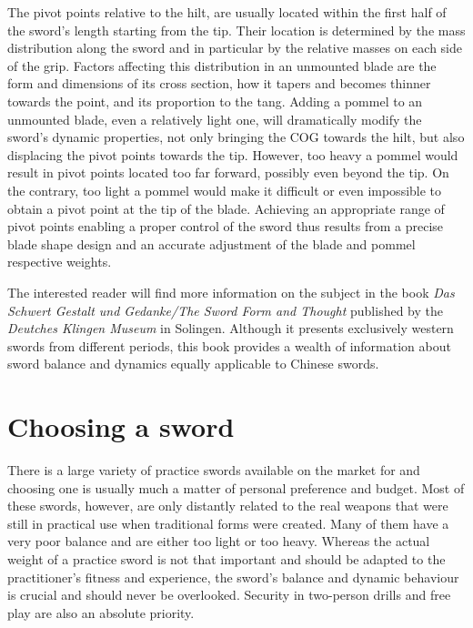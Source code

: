 The pivot points relative to the hilt, are usually located within the first half of the sword's length starting from the tip. 
Their location is determined by the mass distribution along the sword and in particular by the relative masses on each side of the grip. Factors affecting this distribution in an unmounted blade are the form and dimensions of its cross section, how it tapers and becomes thinner towards the point, and its proportion to the tang. Adding a pommel to an unmounted blade, even a relatively light one, will dramatically modify the sword's dynamic properties, not only bringing the COG towards the hilt, but also displacing the pivot points towards the tip. However, too heavy a pommel would result in pivot points located too far forward, possibly even beyond the tip. On the contrary, too light a pommel would make it difficult or even impossible to obtain a pivot point at the tip of the blade. Achieving an appropriate range of pivot points enabling a proper control of the sword thus results from a precise blade shape design and an accurate adjustment of the blade and pommel respective weights. 

The interested reader will find more information on the subject in the book \textit{Das Schwert \textendash{} Gestalt und Gedanke/The Sword \textendash{} Form and Thought} published by the \textit{Deutches Klingen Museum} in Solingen. Although it presents exclusively western swords from different periods, this book provides a wealth of information about sword balance and dynamics equally applicable to Chinese swords. 

\section{Choosing a \Taijijian{} sword}
There is a large variety of practice swords available on the market for \Taijijian{} and choosing one is usually much a matter of personal preference and budget.
Most of these swords, however, are only distantly related to the real weapons that were still in practical use when traditional \Taijijian{} forms were created.
Many of them have a very poor balance and are either too light or too heavy.
Whereas the actual weight of a practice sword is not that important and should be adapted to the practitioner's fitness and experience, the sword's balance and dynamic behaviour is crucial and should never be overlooked.
Security in two-person drills and free play are also an absolute priority.

